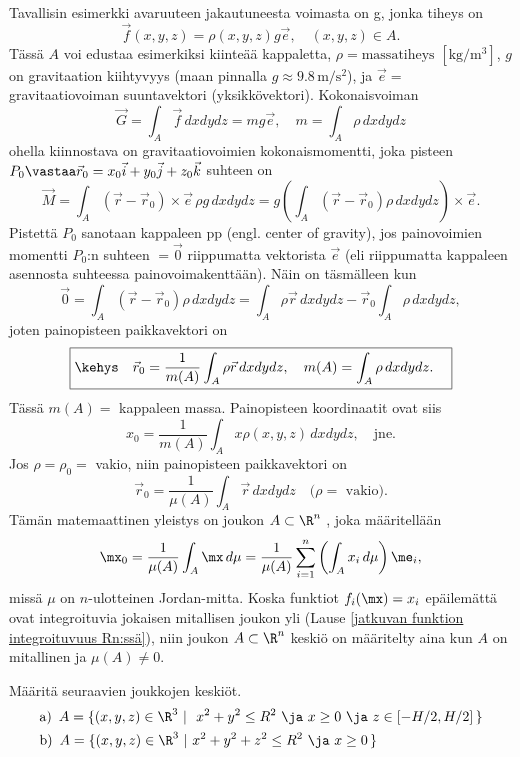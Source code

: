 Tavallisin esimerkki avaruuteen jakautuneesta voimasta on g,
jonka tiheys on
\[
\vec f(x,y,z)=\rho(x,y,z)g\vec e,\quad (x,y,z)\in A.
\]
Tässä $A$ voi edustaa esimerkiksi kiinteää kappaletta, $\rho=\text{massatiheys}$ 
$[\text{kg}/\text{m}^3]$, $g$ on gravitaation kiihtyvyys (maan pinnalla 
$g\approx 9.8\,\text{m}/\text{s}^2$), ja $\vec e=$ gravitaatiovoiman suuntavektori 
(yksikkövektori). Kokonaisvoiman
\[
\vec G=\int_A\vec f\,dxdydz=mg\vec e,\quad m=\int_A\rho\,dxdydz
\]
ohella kiinnostava on gravitaatiovoimien kokonaismomentti, joka pisteen 
$P_0 \vastaa \vec r_0=x_0\vec i+y_0\vec j+z_0\vec k$ suhteen on
\[
\vec M = \int_A(\vec r-\vec r_0)\times\vec e\,\rho g\,dxdydz 
       = g\left(\int_A (\vec r-\vec r_0)\rho\,dxdydz\right)\times\vec e.
\]
Pistettä $P_0$ sanotaan kappaleen pp (engl. center of gravity),
jos painovoimien momentti $P_0$:n suhteen $=\vec 0$ riippumatta vektorista $\vec e$ 
(eli riippumatta kappaleen asennosta suhteessa painovoimakenttään). Näin on täsmälleen
kun
\[
\vec 0 = \int_A (\vec r-\vec r_0)\rho\,dxdydz 
       = \int_A \rho\vec r\,dxdydz - \vec r_0 \int_A \rho\,dxdydz,
\]
joten painopisteen paikkavektori on
\[
\boxed{\kehys\quad \vec r_0 = \frac{1}{m(A)}\int_A \rho\vec r\,dxdydz, \quad 
                                             m(A)=\int_A \rho\,dxdydz. \quad}
\]
Tässä $m(A)=$ kappaleen massa. Painopisteen koordinaatit ovat siis
\[
x_0=\frac{1}{m(A)}\int_A x\rho(x,y,z)\,dxdydz,\quad\text{jne.}
\]
Jos $\rho=\rho_0=$ vakio, niin painopisteen paikkavektori on
\[
\vec r_0 = \frac{1}{\mu(A)}\int_A \vec r\,dxdydz \quad \text{($\rho=$ vakio)}.
\]
Tämän matemaattinen yleistys on joukon $A \subset \R^n$ , joka määritellään
\[
\mx_0 = \frac{1}{\mu(A)}\int_A \mx\,d\mu 
      = \frac{1}{\mu(A)}\sum_{i=1}^n\left(\int_A x_i\,d\mu\right)\me_i,
\]
missä $\mu$ on $n$-ulotteinen Jordan-mitta. Koska funktiot $f_i(\mx)=x_i$ epäilemättä ovat
integroituvia jokaisen mitallisen joukon yli
(Lause \ref{jatkuvan funktion integroituvuus Rn:ssä}), niin joukon $A \subset \R^n$ keskiö on 
määritelty aina kun $A$ on mitallinen ja $\mu(A) \neq 0$.
\begin{Exa} Määritä seuraavien joukkojen keskiöt. 
\begin{align*}
&\text{a)}\,\ A=\{(x,y,z)\in\R^3 \ | \ x^2+y^2\leq R^2 \ \ja \ x\geq 0 \ 
                                                          \ja \ z\in [-H/2,H/2]\,\} \\
&\text{b)}\,\ A=\{(x,y,z)\in\R^3 \ | \ x^2+y^2+z^2\leq R^2 \ \ja \ x\geq 0\,\}
\end{align*}
\end{Exa}
